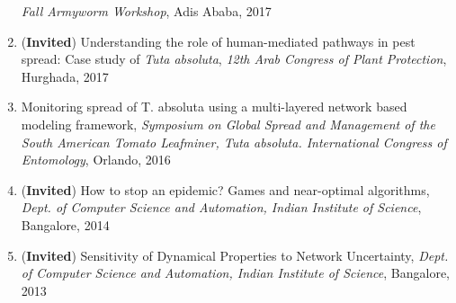 \documentclass[margin,10pt]{res} %
\begin{document}
\begin{resume}
\begin{enumerate}[1.]
    \emph{Fall Armyworm Workshop}, Adis Ababa, 2017
    \item (\textbf{Invited}) Understanding the role of human-mediated
    pathways in pest spread: Case study of \emph{Tuta absoluta}, \emph{12th
    Arab Congress of Plant Protection}, Hurghada, 2017
   \item Monitoring spread of T. absoluta using a multi-layered network
   based modeling framework, \emph{Symposium on Global Spread and Management
   of the South American Tomato Leafminer, Tuta absoluta. International
Congress of Entomology}, Orlando, 2016
\item (\textbf{Invited}) How to stop an epidemic?  Games and near-optimal
algorithms, \emph{Dept. of Computer Science and Automation, Indian
Institute of Science}, Bangalore, 2014
\item (\textbf{Invited}) Sensitivity of Dynamical Properties to Network
Uncertainty, \emph{Dept. of Computer Science and Automation, Indian
Institute of Science}, Bangalore, 2013
\end{enumerate}
\iftoggle{compact}{
\section{\textnormal{\textsc{Selected publications}}} 
}{
}
\end{resume}
\end{document}

